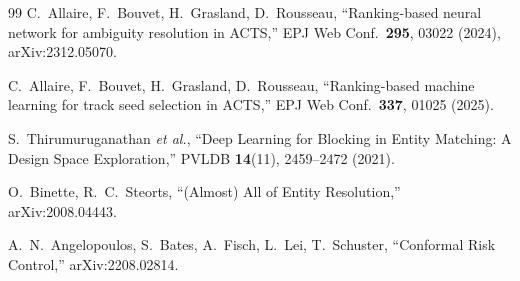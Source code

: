 \documentclass[11pt]{article}
\begin{document}
\begin{thebibliography}{99}
 C.~Allaire, F.~Bouvet, H.~Grasland, D.~Rousseau,
  ``Ranking-based neural network for ambiguity resolution in ACTS,''
  EPJ Web Conf.\ \textbf{295}, 03022 (2024), arXiv:2312.05070.

 C.~Allaire, F.~Bouvet, H.~Grasland, D.~Rousseau,
  ``Ranking-based machine learning for track seed selection in ACTS,''
  EPJ Web Conf.\ \textbf{337}, 01025 (2025).

 S.~Thirumuruganathan \emph{et al.},
  ``Deep Learning for Blocking in Entity Matching: A Design Space Exploration,''
  PVLDB \textbf{14}(11), 2459--2472 (2021).

 O.~Binette, R.~C.~Steorts,
  ``(Almost) All of Entity Resolution,'' arXiv:2008.04443.

 A.~N.~Angelopoulos, S.~Bates, A.~Fisch, L.~Lei, T.~Schuster,
  ``Conformal Risk Control,'' arXiv:2208.02814.

\end{thebibliography}
\end{document}
